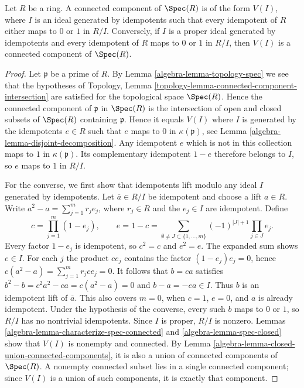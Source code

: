 \begin{lemma}
\label{editorial-source-lemma-connected-component}
Let $R$ be a ring.
A connected component of
$\Spec(R)$ is of the form $V(I)$,
where $I$ is an ideal generated by idempotents
such that every idempotent of $R$ either maps to
$0$ or $1$ in $R/I$.
Conversely, if $I$ is a proper ideal generated by idempotents and
every idempotent of $R$ maps to $0$ or $1$ in $R/I$, then $V(I)$
is a connected component of $\Spec(R)$.
\end{lemma}

\begin{proof}
Let $\mathfrak p$ be a prime of $R$. By
Lemma \ref{algebra-lemma-topology-spec}
we see that the hypotheses of
Topology, Lemma \ref{topology-lemma-connected-component-intersection}
are satisfied for the topological space $\Spec(R)$.
Hence the connected component of $\mathfrak p$ in $\Spec(R)$
is the intersection of open and closed subsets of $\Spec(R)$
containing $\mathfrak p$. Hence it equals $V(I)$ where
$I$ is generated by the idempotents $e \in R$ such that $e$ maps to $0$
in $\kappa(\mathfrak p)$, see
Lemma \ref{algebra-lemma-disjoint-decomposition}.
Any idempotent $e$ which is not in this collection maps to $1$
in $\kappa(\mathfrak p)$. Its complementary idempotent $1-e$
therefore belongs to $I$, so $e$ maps to $1$ in $R/I$.

\medskip\noindent
For the converse, we first show that idempotents lift modulo any ideal
$I$ generated by idempotents. Let $\overline a\in R/I$ be idempotent
and choose a lift $a\in R$. Write
$a^2-a=\sum_{j=1}^m r_je_j$, where $r_j\in R$ and the $e_j\in I$
are idempotent. Define
$$
c=\prod_{j=1}^m(1-e_j),\qquad
e=1-c=
\sum_{\emptyset\ne J\subset\{1,\ldots,m\}}
(-1)^{|J|+1}\prod_{j\in J}e_j.
$$
Every factor $1-e_j$ is idempotent, so $c^2=c$ and $e^2=e$.
The expanded sum shows $e\in I$. For each $j$ the product $ce_j$
contains the factor $(1-e_j)e_j=0$, hence
$c(a^2-a)=\sum_{j=1}^m r_jce_j=0$.
It follows that $b=ca$ satisfies
$b^2-b=c^2a^2-ca=c(a^2-a)=0$ and $b-a=-ea\in I$.
Thus $b$ is an idempotent lift of $\overline a$.
This also covers $m=0$, when $c=1$, $e=0$, and $a$ is already idempotent.
Under the hypothesis of the converse, every such $b$ maps to $0$ or $1$,
so $R/I$ has no nontrivial idempotents. Since $I$ is proper, $R/I$ is
nonzero. Lemmas \ref{algebra-lemma-characterize-spec-connected} and
\ref{algebra-lemma-spec-closed} show that $V(I)$ is nonempty and connected.
By Lemma \ref{algebra-lemma-closed-union-connected-components}, it is also
a union of connected components of $\Spec(R)$. A nonempty connected
subset lies in a single connected component; since $V(I)$ is a union
of such components, it is exactly that component.
\end{proof}